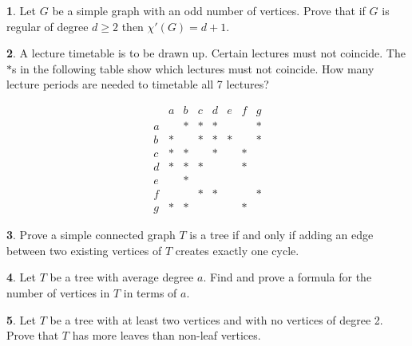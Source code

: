 \documentclass[12pt]{article}
\theoremstyle{definition}
\newtheorem{problem}{}
\begin{document}
\begin{problem}
Let $G$ be a simple graph with an odd number of vertices. Prove that if $G$ is regular of degree $d\geq 2$ then $\chi ' (G) = d+1$.
\end{problem}

\begin{problem} 
A lecture timetable is to be drawn up. Certain lectures must not coincide. The $\ast$s in the following table show which lectures must not coincide. How many lecture periods are needed to timetable all 7 lectures?

$$\begin{array}{r|ccccccc}
&a&b&c&d&e&f&g\\\hline
a&&\ast&\ast&\ast&&&\ast\\
b&\ast&&\ast&\ast&\ast&&\ast\\
c&\ast&\ast&&\ast&&\ast&\\
d&\ast&\ast&\ast&&&\ast&\\
e&&\ast&&&&&\\
f&&&\ast&\ast&&&\ast\\
g&\ast&\ast&&&&\ast&\end{array}
$$
\end{problem}

\begin{problem}
Prove a simple connected graph $T$ is a tree if and only if adding an edge between two existing vertices of $T$ creates exactly one cycle.
\end{problem}


\begin{problem}
Let $T$ be a tree with average degree $a$. Find and prove a formula for the number of vertices in $T$ in terms of $a$.
\end{problem}

\begin{problem}
Let $T$ be a tree  with at least two vertices and with no vertices of degree 2. Prove that $T$ has more leaves than non-leaf vertices.
\end{problem}
\end{document}

